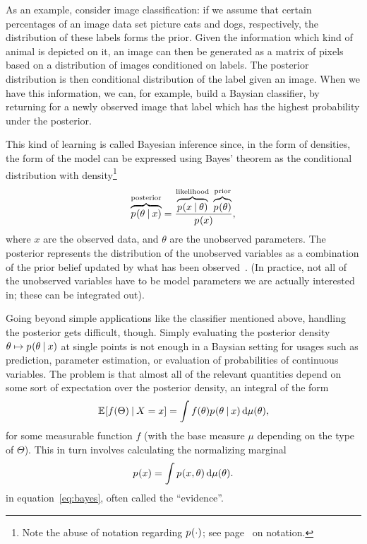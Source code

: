 As an example, consider image classification: if we assume that certain percentages of an image data
set picture cats and dogs, respectively, the distribution of these labels forms the prior.  Given
the information which kind of animal is depicted on it, an image can then be generated as a matrix
of pixels based on a distribution of images conditioned on labels.  The posterior distribution is
then conditional distribution of the label given an image.  When we have this information, we can,
for example, build a Baysian classifier, by returning for a newly observed image that label which
has the highest probability under the posterior.

This kind of learning is called Bayesian inference since, in the form of densities, the form of the
model can be expressed using Bayes' theorem as the conditional distribution with
density\footnote{Note the abuse of notation regarding \(\prob{\cdot}\); see
  page~\pageref{cha:notation} on notation.}
\begin{equation}
  \label{eq:bayes}
  \overbrace{\prob{\theta \given x}}^{\text{posterior}} =
  \frac{\overbrace{\prob{x \given \theta}}^{\text{likelihood}}\;
    \overbrace{\prob{\theta}}^{\text{prior}}}{\prob{x}},
\end{equation}
where \(x\) are the observed data, and \(\theta\) are the unobserved parameters. The posterior
represents the distribution of the unobserved variables as a combination of the prior belief updated
by what has been observed~\parencite{congdon2006bayesian}.  (In practice, not all of the unobserved
variables have to be model parameters we are actually interested in; these can be integrated out).

Going beyond simple applications like the classifier mentioned above, handling the posterior gets
difficult, though.  Simply evaluating the posterior density
\(\theta \mapsto \prob{\theta \given x}\) at single points is not enough in a Baysian setting for
usages such as prediction, parameter estimation, or evaluation of probabilities of continuous
variables.  The problem is that almost all of the relevant quantities depend on some sort of
expectation over the posterior density, an integral of the form
\begin{equation}
  \label{eq:posterior-expectation}
  \Exp{f(\Theta) \given X = x} = \int f(\theta) \prob{\theta \given x} \dif \mu(\theta),
\end{equation}
for some measurable function \(f\) (with the base measure \(\mu\) depending on the type of
\(\Theta\)). This in turn involves calculating the normalizing marginal
\begin{equation}
  \label{eq:normalizing}
  \prob{x} = \int \prob{x, \theta} \dif \mu(\theta).
\end{equation}
in equation~\ref{eq:bayes}, often called the \enquote{evidence}.

